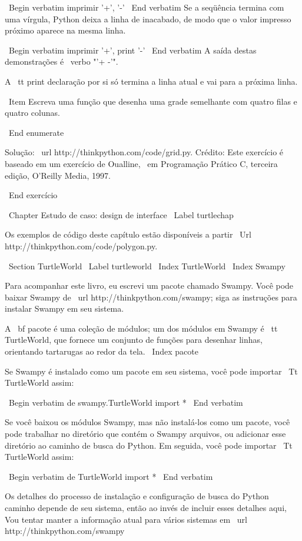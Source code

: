 \documentclass[10pt]{book}
\begin{document}
\begin {itemize}
{\ Begin {verbatim}
imprimir '+', '-'
\ End {verbatim}
%
Se a seqüência termina com uma vírgula, Python deixa a linha de inacabado,
de modo que o valor impresso próximo aparece na mesma linha.

\ Begin {verbatim}
imprimir '+', 
print '-'
\ End {verbatim}
%
A saída destas demonstrações é \ verbo "'+ -'".

A {\ tt print} declaração por si só termina a linha atual e
vai para a próxima linha.

\ Item Escreva uma função que desenha uma grade semelhante
com quatro filas e quatro colunas.

\ End {enumerate}

Solução: \ url {http://thinkpython.com/code/grid.py}.
Crédito: Este exercício é baseado em um exercício de Oualline, {\ em
    Programação Prático C, terceira edição}, O'Reilly Media, 1997.

\ End {} exercício





\ Chapter {Estudo de caso: design de interface}
\ Label {} turtlechap

Os exemplos de código deste capítulo estão disponíveis a partir
\ Url {http://thinkpython.com/code/polygon.py}.


\ Section {} TurtleWorld
\ Label {} turtleworld
\ Index {} TurtleWorld
\ Index {} Swampy

Para acompanhar este livro, eu escrevi um pacote chamado Swampy.
Você pode baixar Swampy de \ url {http://thinkpython.com/swampy};
siga as instruções para instalar Swampy em seu sistema.

A {\ bf pacote} é uma coleção de módulos; um dos módulos em
Swampy é {\ tt TurtleWorld}, que fornece um conjunto de funções para
desenhar linhas, orientando tartarugas ao redor da tela.
\ Index {pacote}

Se Swampy é instalado como um pacote em seu sistema, você pode importar
{\ Tt TurtleWorld} assim:

\ Begin {verbatim}
de swampy.TurtleWorld import *
\ End {verbatim}

Se você baixou os módulos Swampy, mas não instalá-los como um
pacote, você pode trabalhar no diretório que contém o Swampy
arquivos, ou adicionar esse diretório ao caminho de busca do Python. Em seguida, você pode importar
{\ Tt TurtleWorld} assim:

\ Begin {verbatim}
de TurtleWorld import *
\ End {verbatim}

Os detalhes do processo de instalação e configuração de busca do Python
caminho depende de seu sistema, então ao invés de incluir esses detalhes aqui,
Vou tentar manter a informação atual para vários sistemas
em \ url {http://thinkpython.com/swampy}

}
\end{itemize}
\end{document}
